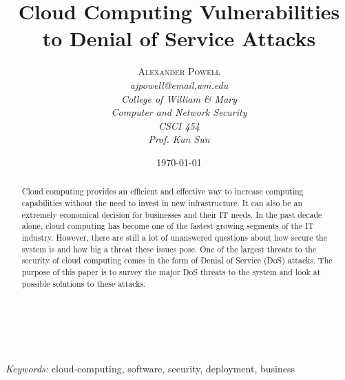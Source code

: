 \documentclass[a4paper, 8pt]{article} %
\title{\textbf{Cloud Computing Vulnerabilities to Denial of Service Attacks}} %
\author{\textsc{Alexander Powell} %
\\{\textit{ajpowell@email.wm.edu}} %
\\{\textit{College of William \& Mary}} %
\\{\textit{Computer and Network Security}} %
\\{\textit{CSCI 454}} %
\\{\textit{Prof. Kun Sun}}} %
\date{\today} %
\makeatletter
\renewcommand{\maketitle}{ %
\begin{flushright} %
{\LARGE\@title} %

\vspace{50pt} %

{\large\@author} %
\\\@date %

\vspace{40pt} %
\end{flushright}
}
\makeatother
\begin{document}
\maketitle %


\begin{doublespacing}
\begin{abstract}
Cloud computing provides an efficient and effective way to increase computing capabilities without the need to invest in new infrastructure.  It can also be an extremely economical decision for businesses and their IT needs.  In the past decade alone, cloud computing has become one of the fastest growing segments of the IT industry.  However, there are still a lot of unanswered questions about how secure the system is and how big a threat these issues pose.  One of the largest threats to the security of cloud computing comes in the form of Denial of Service (DoS) attacks.  The purpose of this paper is to survey the major DoS threats to the system and look at possible solutions to these attacks.  \\ \\
\end{abstract}
\end{doublespacing}

\hspace*{3,6mm}\textit{Keywords:} cloud-computing, software, security, deployment, business %

\vspace{30pt} %

\newpage
\end{document}
